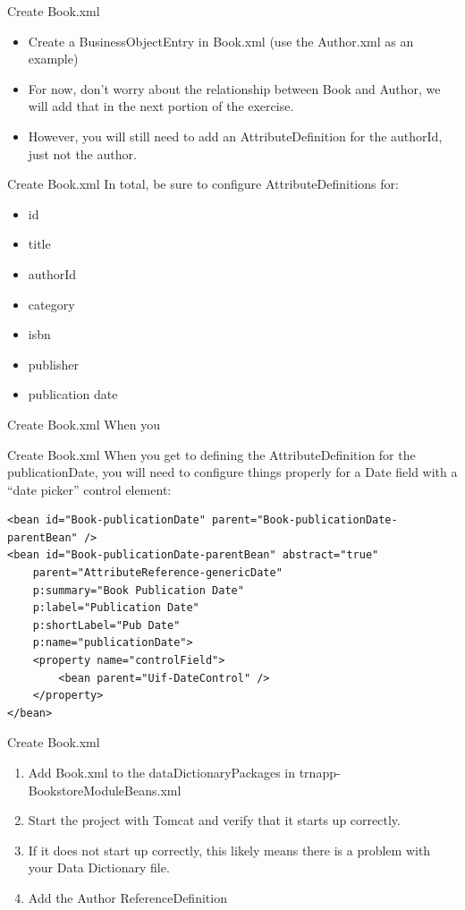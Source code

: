 \documentclass[xcolor=dvipsnames,14pt,professionalfonts]{beamer}
\begin{document}
\begin{frame}{Create Book.xml}
  \begin{itemize}
    \item Create a BusinessObjectEntry in Book.xml (use the Author.xml as an example)
    \item For now, don’t worry about the relationship between Book and Author, we will add that in the next portion of the exercise.
    \item However, you will still need to add an AttributeDefinition
      for the authorId, just not the author.
    \end{itemize}
  \end{frame}
  
\begin{frame}{Create Book.xml}
  In total, be sure to configure AttributeDefinitions for:
  \begin{itemize}
  \item id
  \item title
  \item authorId
  \item category
  \item isbn
  \item publisher
  \item publication date
\end{itemize}
\end{frame}

\begin{frame}[fragile]{Create Book.xml}
  When you 
\end{frame}

\begin{frame}[fragile]{Create Book.xml}
 When you get to defining the AttributeDefinition for the
 publicationDate, you will need to configure things properly for a
 Date field with a “date picker” control element:
 
 \begin{verbatim}
<bean id="Book-publicationDate" parent="Book-publicationDate-parentBean" />
<bean id="Book-publicationDate-parentBean" abstract="true" 
    parent="AttributeReference-genericDate"
    p:summary="Book Publication Date"
    p:label="Publication Date"
    p:shortLabel="Pub Date"
    p:name="publicationDate">
    <property name="controlField">
        <bean parent="Uif-DateControl" />
    </property>
</bean>
\end{verbatim}
\end{frame}

\begin{frame}{Create Book.xml}
  \begin{enumerate}
  \item Add Book.xml to the dataDictionaryPackages in trnapp-BookstoreModuleBeans.xml
  \item Start the project with Tomcat and verify that it starts up correctly.
  \item If it does not start up correctly, this likely means there is a problem with your Data Dictionary file.
  \item Add the Author ReferenceDefinition
    \end{enumerate}
  \end{frame}
\end{document}
